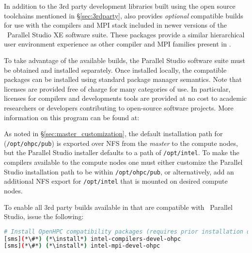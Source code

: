 In addition to the 3rd party development libraries built using the open source
toolchains mentioned in \S\ref{sec:3rdparty}, \OHPC{} also provides {\em
  optional} compatible builds for use with the compilers and MPI stack included
in newer versions of the \IntelR{}~Parallel Studio XE software suite.  These
packages provide a similar hierarchical user
environment experience as other compiler and MPI families present in \OHPC{}.

To take advantage of the available builds, the Parallel Studio software suite
must be obtained and installed separately. Once installed locally, the \OHPC{}
compatible packages can be installed using standard package manager semantics.
Note that licenses are provided free of charge for many categories of use. In
particular, licenses for compilers and developments tools are provided at no
cost to academic researchers or developers contributing to open-source software
projects. More information on this program can be found at:

\begin{center}
  \href{https://software.intel.com/en-us/qualify-for-free-software}
       {\color{blue}{https://software.intel.com/en-us/qualify-for-free-software}}
\end{center}

\begin{center}
\begin{tcolorbox}[]
As noted in \S\ref{sec:master_customization}, the default installation path for
\OHPC{} (\texttt{/opt/ohpc/pub}) is exported over NFS from the {\em master} to the 
compute nodes, but the Parallel Studio installer defaults to a path of 
\texttt{/opt/intel}. To make the \IntelR{} compilers available to the compute 
nodes one must either customize the Parallel Studio installation path to be 
within \texttt{/opt/ohpc/pub}, or alternatively, add an additional NFS export
for \texttt{/opt/intel} that is mounted on desired compute nodes.
\end{tcolorbox}
\end{center}

\noindent To enable all 3rd party builds available in \OHPC{} that are compatible with
\IntelR{}~Parallel Studio, issue the following:

\begin{lstlisting}[language=bash,keywords={},upquote=true,keepspaces]
# Install OpenHPC compatibility packages (requires prior installation of Parallel Studio)
[sms](*\#*) (*\install*) intel-compilers-devel-ohpc
[sms](*\#*) (*\install*) intel-mpi-devel-ohpc
\end{lstlisting}

